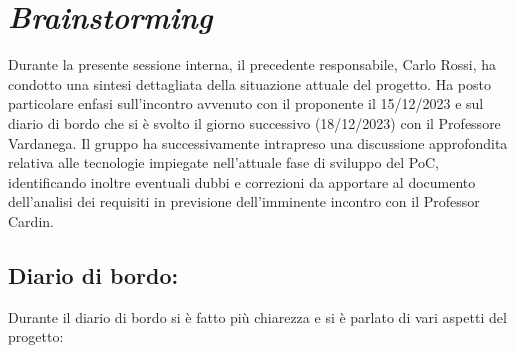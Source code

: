 \section{\textit{Brainstorming}}

Durante la presente sessione interna, il precedente responsabile, Carlo Rossi, ha condotto 
una sintesi dettagliata della situazione attuale del progetto. Ha posto particolare enfasi 
sull'incontro avvenuto con il proponente il 15/12/2023 e sul diario di bordo che si è svolto il 
giorno successivo (18/12/2023) con il Professore Vardanega. Il gruppo ha successivamente intrapreso 
una discussione approfondita relativa alle tecnologie impiegate nell'attuale fase di sviluppo del PoC, 
identificando inoltre eventuali dubbi e correzioni da apportare al documento dell'analisi 
dei requisiti in previsione dell'imminente incontro con il Professor Cardin.
\\

\subsection*{Diario di bordo:}
Durante il diario di bordo si è fatto più chiarezza e si è parlato di vari aspetti del progetto:

